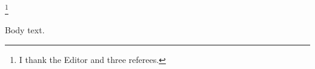 \documentclass{amsart}
\title{}
\begin{document}
\date{August 31, 2017}
\thanks{I thank the Editor and three referees.}
\maketitle
Body text.
\end{document}
